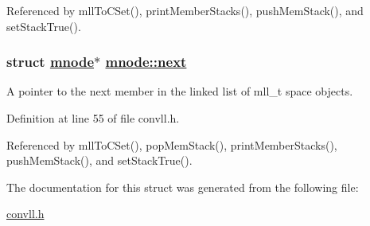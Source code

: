 Referenced by mll\-To\-CSet(), print\-Member\-Stacks(), push\-Mem\-Stack(), and set\-Stack\-True().\hypertarget{structmnode_o1}{
\subsubsection[next]{\setlength{\rightskip}{0pt plus 5cm}struct \hyperlink{structmnode}{mnode}$\ast$ \hyperlink{structmnode_o1}{mnode::next}}}
\label{structmnode_o1}


A pointer to the next member in the linked list of mll\_\-t space objects. 

Definition at line 55 of file convll.h.

Referenced by mll\-To\-CSet(), pop\-Mem\-Stack(), print\-Member\-Stacks(), push\-Mem\-Stack(), and set\-Stack\-True().

The documentation for this struct was generated from the following file:\begin{CompactItemize}
\item 
\hyperlink{convll_8h}{convll.h}\end{CompactItemize}
